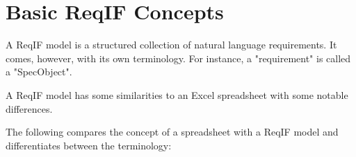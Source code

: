 % 

\section{Basic ReqIF Concepts}

A ReqIF model is a structured collection of natural language requirements.  It comes, however, with its own terminology.  For instance, a "requirement" is called a "SpecObject".

A ReqIF model has some similarities to an Excel spreadsheet with some notable differences.

The following compares the concept of a spreadsheet with a ReqIF model and differentiates between the terminology:

